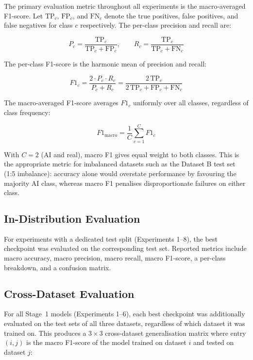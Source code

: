 The primary evaluation metric throughout all experiments is the macro-averaged F1-score. Let
$\text{TP}_c$, $\text{FP}_c$, and $\text{FN}_c$ denote the true positives, false positives, and
false negatives for class $c$ respectively. The per-class precision and recall are:

\begin{equation}
  P_c = \frac{\text{TP}_c}{\text{TP}_c + \text{FP}_c},
  \qquad
  R_c = \frac{\text{TP}_c}{\text{TP}_c + \text{FN}_c}
  \label{eq:pr}
\end{equation}

The per-class F1-score is the harmonic mean of precision and recall:

\begin{equation}
  F1_c = \frac{2 \cdot P_c \cdot R_c}{P_c + R_c}
        = \frac{2\,\text{TP}_c}{2\,\text{TP}_c + \text{FP}_c + \text{FN}_c}
  \label{eq:f1}
\end{equation}

The macro-averaged F1-score averages $F1_c$ uniformly over all classes, regardless of class
frequency:

\begin{equation}
  F1_{\text{macro}} = \frac{1}{C} \sum_{c=1}^{C} F1_c
  \label{eq:macro_f1}
\end{equation}

With $C = 2$ (AI and real), macro F1 gives equal weight to both classes. This is the appropriate
metric for imbalanced datasets such as the Dataset B test set (1:5 imbalance): accuracy alone
would overstate performance by favouring the majority AI class, whereas macro F1 penalises
disproportionate failures on either class.

\subsection{In-Distribution Evaluation}
\label{sec:indist_eval}

For experiments with a dedicated test split (Experiments 1--8), the best checkpoint was
evaluated on the corresponding test set. Reported metrics include macro accuracy, macro
precision, macro recall, macro F1-score, a per-class breakdown, and a confusion matrix.

\subsection{Cross-Dataset Evaluation}
\label{sec:crossdataset_eval}

For all Stage~1 models (Experiments 1--6), each best checkpoint was additionally evaluated on
the test sets of all three datasets, regardless of which dataset it was trained on. This
produces a $3 \times 3$ cross-dataset generalisation matrix where entry $(i, j)$ is the macro
F1-score of the model trained on dataset $i$ and tested on dataset $j$:

